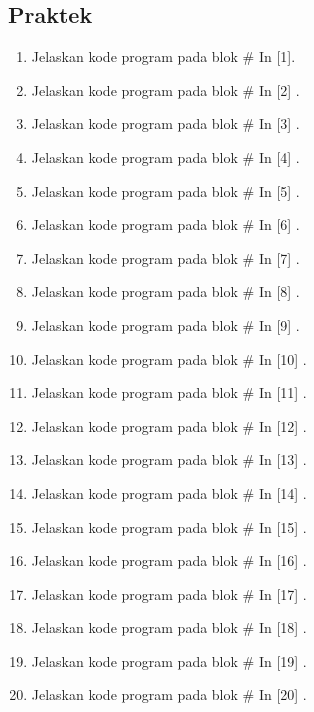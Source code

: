 \subsection{Praktek}
\begin{enumerate}
\item Jelaskan kode program pada blok \# In [1]. 

\item Jelaskan kode program pada blok \# In [2] .

\item Jelaskan kode program pada blok \# In [3] .

\item Jelaskan kode program pada blok \# In [4] .

\item Jelaskan kode program pada blok \# In [5] .

\item Jelaskan kode program pada blok \# In [6] .

\item Jelaskan kode program pada blok \# In [7] .

\item Jelaskan kode program pada blok \# In [8] .

\item Jelaskan kode program pada blok \# In [9] .

\item Jelaskan kode program pada blok \# In [10] .

\item Jelaskan kode program pada blok \# In [11] .

\item Jelaskan kode program pada blok \# In [12] .

\item Jelaskan kode program pada blok \# In [13] .

\item Jelaskan kode program pada blok \# In [14] .

\item Jelaskan kode program pada blok \# In [15] .

\item Jelaskan kode program pada blok \# In [16] .

\item Jelaskan kode program pada blok \# In [17] .

\item Jelaskan kode program pada blok \# In [18] .

\item Jelaskan kode program pada blok \# In [19] .

\item Jelaskan kode program pada blok \# In [20] .


\end{enumerate}


